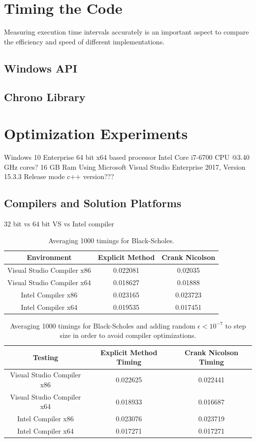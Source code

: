 \documentclass[12pt, oneside]{book}
\theoremstyle{plain}
\theoremstyle{definition}
\begin{document}
\section{Timing the Code}
Measuring execution time intervals accurately is an important aspect to compare the efficiency and speed of different implementations.

\subsection{Windows API}

\subsection{Chrono Library}

\section{Optimization Experiments}


Windows 10 Enterprise 64 bit 
x64 based processor
Intel Core i7-6700 CPU @3.40 GHz cores?
16 GB Ram
Using Microsoft Visual Studio Enterprise 2017, Version 15.3.3 Release mode
c++ version???

\subsection{Compilers and Solution Platforms}
32 bit vs 64 bit 
VS vs Intel compiler
\begin{table}[h!]
\centering
 \begin{tabular}{||c c c||} 
 \hline
 Environment & Explicit Method & Crank Nicolson\\ [0.5ex] 
 \hline\hline\hline
 Visual Studio Compiler x86 & 0.022081 & 0.02035\\ 
 Visual Studio Compiler x64 & 0.018627 & 0.01888\\
 Intel Compiler x86 & 0.023165 & 0.023723\\
 Intel Compiler x64 & 0.019535 & 0.017451\\ [1ex] 
 \hline
 \end{tabular}
 \caption{Averaging 1000 timings for Black-Scholes.}
\end{table}

\begin{table}[htp!]
\centering
 \begin{tabular}{||c c c||} 
 \hline
 Testing & Explicit Method Timing & Crank Nicolson Timing\\ [0.5ex] 
 \hline\hline\hline
 Visual Studio Compiler x86 & 0.022625 & 0.022441\\ 
 Visual Studio Compiler x64 & 0.018933 & 0.016687
\\
 Intel Compiler x86 & 0.023076 & 0.023719\\
 Intel Compiler x64 & 0.017271 & 0.017271\\[1ex] 
 \hline
 \end{tabular}
 \caption{Averaging 1000 timings for Black-Scholes and adding random $\epsilon < 10^{-7} $ to step size in order to avoid compiler optimizations.}
\end{table}
\end{document}
